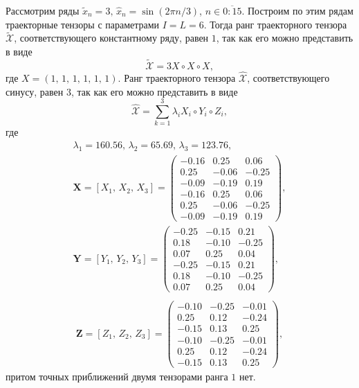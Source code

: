 \documentclass[specialist,
    substylefile = spbu_report.rtx,
    subf,href,colorlinks=true, 12pt]{disser}
\theoremstyle{plain}
\theoremstyle{definition}
\theoremstyle{remark}
\begin{document}
    Рассмотрим ряды $\tilde{x}_n=3,\, \hat{x}_n=\sin(2\pi n / 3)$, $n \in \overline{0:15}$.
    Построим по этим рядам траекторные тензоры с параметрами $I=L=6$.
    Тогда ранг траекторного тензора $\tilde{\mathcal{X}}$, соответствующего константному ряду, равен $1$, так как его
    можно представить в виде
    \[
        \tilde{\mathcal{X}} = 3 X\circ X \circ X,
    \]
    где $X=(1,\, 1,\, 1,\, 1,\, 1,\, 1)$.
    Ранг траекторного тензора $\hat{\mathcal{X}}$, соответствующего синусу, равен $3$, так как его можно представить в виде
    \[
        \hat{\mathcal{X}}=\sum_{k=1}^{3}\lambda_i X_i \circ Y_i\circ Z_i,
    \]
    где
    \begin{gather*}
        \lambda_1 =160.56,\, \lambda_2 =65.69,\, \lambda_3 =123.76,\\
        \mathbf{X}=[X_1,\, X_2,\, X_3] =
        \begin{pmatrix}
            -0.16 & 0.25  & 0.06  \\
            0.25  & -0.06 & -0.25 \\
            -0.09 & -0.19 & 0.19  \\
            -0.16 & 0.25  & 0.06  \\
            0.25  & -0.06 & -0.25 \\
            -0.09 & -0.19 & 0.19
        \end{pmatrix},\\
        \mathbf{Y}=[Y_1,\, Y_2,\, Y_3] =
        \begin{pmatrix}
            -0.25 & -0.15 & 0.21  \\
            0.18  & -0.10 & -0.25 \\
            0.07  & 0.25  & 0.04  \\
            -0.25 & -0.15 & 0.21  \\
            0.18  & -0.10 & -0.25 \\
            0.07  & 0.25  & 0.04
        \end{pmatrix},\\
    \end{gather*}
    \begin{gather*}
        \mathbf{Z}=[Z_1,\, Z_2,\, Z_3] =
        \begin{pmatrix}
            -0.10 & -0.25 & -0.01 \\
            0.25  & 0.12  & -0.24 \\
            -0.15 & 0.13  & 0.25  \\
            -0.10 & -0.25 & -0.01 \\
            0.25  & 0.12  & -0.24 \\
            -0.15 & 0.13  & 0.25
        \end{pmatrix},
    \end{gather*}
    притом точных приближений двумя тензорами ранга $1$ нет.
\end{document}
